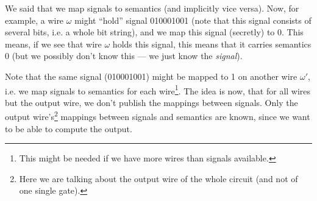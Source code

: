 We said that we map signals to semantics (and implicitly vice versa). Now, for example, a wire $\omega$ might ``hold'' signal 010001001 (note that this signal consists of several bits, i.e. a whole bit string), and we map this signal (secretly) to 0. This means, if we see that wire $\omega$ holds this signal, this means that it carries semantics 0 (but we possibly don't know this --- we just know the \emph{signal}).

Note that the same signal (010001001) might be mapped to 1 on another wire $\omega'$, i.e. we map signals to semantics for each wire\footnote{This might be needed if we have more wires than signals available.}. The idea is now, that for all wires but the output wire, we don't publish the mappings between signals. Only the output wire's\footnote{Here we are talking about the output wire of the whole circuit (and not of one single gate).} mappings between signals and semantics are known, since we want to be able to compute the output.

